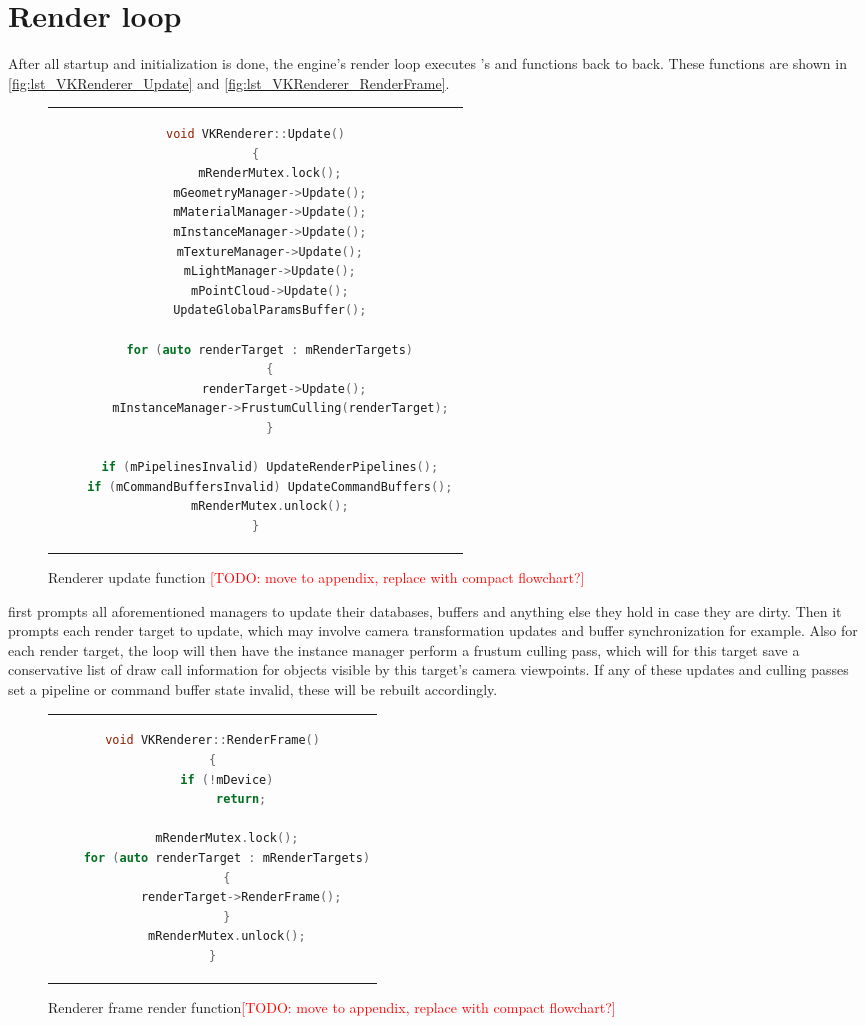 \section{Render loop} 
After all startup and initialization is done, the engine's render loop executes 's  and  functions back to back. These functions are shown in \autoref{fig:lst_VKRenderer_Update} and \autoref{fig:lst_VKRenderer_RenderFrame}. 

\begin{figure}[htb]
  \centering
  \begin{tabular}{c}
  \begin{lstlisting}[language=C++]
void VKRenderer::Update()
{
	mRenderMutex.lock();
	mGeometryManager->Update();
	mMaterialManager->Update();
	mInstanceManager->Update();
	mTextureManager->Update();
	mLightManager->Update();
	mPointCloud->Update();
	UpdateGlobalParamsBuffer();

	for (auto renderTarget : mRenderTargets)
	{
		renderTarget->Update();
		mInstanceManager->FrustumCulling(renderTarget); 
	}

	if (mPipelinesInvalid) UpdateRenderPipelines();
	if (mCommandBuffersInvalid) UpdateCommandBuffers();
	mRenderMutex.unlock();
}
  \end{lstlisting}
  \end{tabular}
  \caption[VKRenderer's Update]{Renderer update function \textcolor{red}{[TODO: move to appendix, replace with compact flowchart?]}}\label{fig:lst_VKRenderer_Update}
\end{figure}

 first prompts all aforementioned managers to update their databases, buffers and anything else they hold in case they are dirty. Then it prompts each render target to update, which may involve camera transformation updates and buffer synchronization for example. Also for each render target, the loop will then have the instance manager perform a frustum culling pass, which will for this target save a conservative list of draw call information for objects visible by this target's camera viewpoints. 
If any of these updates and culling passes set a pipeline or command buffer state invalid, these will be rebuilt accordingly.  

\begin{figure}[htb]
  \centering
  \begin{tabular}{c}
  \begin{lstlisting}[language=C++]
void VKRenderer::RenderFrame()
{
	if (!mDevice)
		return;

	mRenderMutex.lock();
	for (auto renderTarget : mRenderTargets)
	{
		renderTarget->RenderFrame();
	}
	mRenderMutex.unlock();
}
	\end{lstlisting}
  \end{tabular}
  \caption[VKRenderer's RenderFrame]{Renderer frame render function\textcolor{red}{[TODO: move to appendix, replace with compact flowchart?]}}\label{fig:lst_VKRenderer_RenderFrame}
\end{figure}


